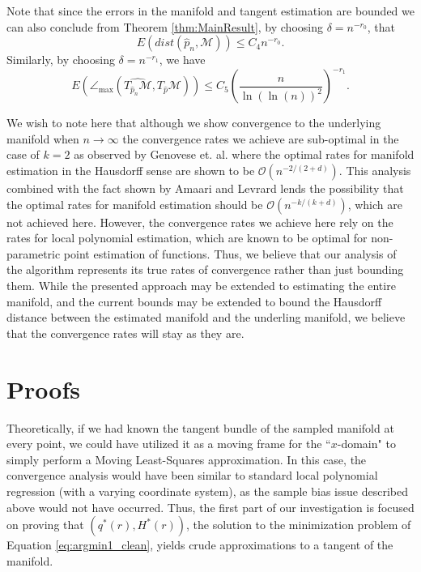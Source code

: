 \documentclass[12pt]{article}
\theoremstyle{remark}
\newcommand{\MM}{\mathcal{M}}
\begin{document}
Note that since the errors in the manifold and tangent estimation are bounded we can also conclude from Theorem \ref{thm:MainResult}, by choosing $\delta = n^{-r_0}$, that
\[
E(dist(\hat p_n, \MM)) \leq C_4 n^{-r_0}.
\]
Similarly, by choosing $\delta = n^{-r_1}$, we have
\[
E(\angle_{\max}(\widehat{T_{\hat p_n}\MM},T_{\hat p}\MM)) \leq  C_5\left(\frac{ n}{\ln\left(\ln(n) \right)^2}\right)^{-r_1}.
\]

We wish to note here that although we show convergence to the underlying manifold when $n\to\infty$ the convergence rates we achieve are sub-optimal in the case of $k=2$ as observed by Genovese et. al. \cite{genovese2012minimax} where the optimal rates for manifold estimation in the Hausdorff sense are shown to be $\mathcal{O}(n^{-2/(2+d)})$. 
This analysis combined with the fact shown by Amaari and Levrard \cite{aamari2019nonasymptotic} lends the possibility that the optimal rates for manifold estimation should be $\mathcal{O}(n^{-k/(k+d)})$, which are not achieved here.
However, the convergence rates we achieve here rely on the rates for local polynomial estimation, which are known to be optimal for non-parametric point estimation of functions.
Thus, we believe that our analysis of the algorithm represents its true rates of convergence rather than just bounding them. While the presented approach may be extended to estimating the entire manifold, and the current bounds may be extended to bound the Hausdorff distance between the estimated manifold and the underling manifold, we believe that the convergence rates will stay as they are. 






\section{Proofs}
\label{sec:Proofs}
Theoretically, if we had known the tangent bundle of the sampled manifold at every point, we could have utilized it as a moving frame for the ``$x$-domain" to simply perform  a Moving Least-Squares approximation.
In this case, the convergence analysis would have been similar to standard local polynomial regression \cite{stone1980optimal} (with a varying coordinate system), as the sample bias issue described above would not have occurred. 
Thus, the first part of our investigation is focused on proving that $(q^*(r), H^*(r))$, the solution to the minimization problem of Equation \eqref{eq:argmin1_clean}, yields crude approximations to a tangent of the manifold.
\end{document}
